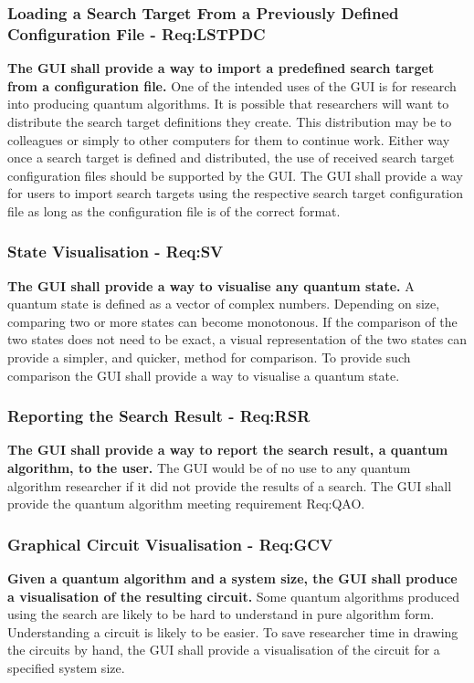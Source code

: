 \subsubsection{Loading a Search Target From a Previously Defined Configuration File - Req:LSTPDC}
\label{sec:reqlstpdc}
\textbf{The GUI shall provide a way to import a predefined search target from a configuration file.}
One of the intended uses of the GUI is for research into producing quantum algorithms.
It is possible that researchers will want to distribute the search target definitions they create.
This distribution may be to colleagues or simply to other computers for them to continue work.
Either way once a search target is defined and distributed, the use of received search target configuration files should be supported by the GUI.
The GUI shall provide a way for users to import search targets using the respective search target configuration file as long as the configuration file is of the correct format.

\subsubsection{State Visualisation - Req:SV}
\label{sec:reqsv}
\textbf{The GUI shall provide a way to visualise any quantum state.}
A quantum state is defined as a vector of complex numbers.
Depending on size, comparing two or more states can become monotonous.
If the comparison of the two states does not need to be exact, a visual representation of the two states can provide a simpler, and quicker, method for comparison.
To provide such comparison the GUI shall provide a way to visualise a quantum state.

\subsubsection{Reporting the Search Result - Req:RSR}
\label{sec:reqrsr}
\textbf{The GUI shall provide a way to report the search result, a quantum algorithm, to the user.}
The GUI would be of no use to any quantum algorithm researcher if it did not provide the results of a search.
The GUI shall provide the quantum algorithm meeting requirement Req:QAO.

\subsubsection{Graphical Circuit Visualisation - Req:GCV}
\label{sec:reqgcv}
\textbf{Given a quantum algorithm and a system size, the GUI shall produce a visualisation of the resulting circuit.}
Some quantum algorithms produced using the search are likely to be hard to understand in pure algorithm form.
Understanding a circuit is likely to be easier.
To save researcher time in drawing the circuits by hand, the GUI shall provide a visualisation of the circuit for a specified system size.

